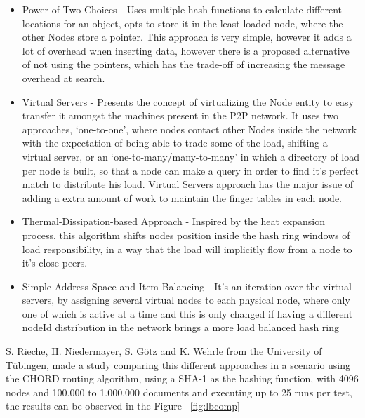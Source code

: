 \begin{itemize}
   \item Power of Two Choices\cite{Byers} - Uses multiple hash functions to calculate different locations for an object, opts to store it in the least loaded node, where the other Nodes store a pointer. This approach is very simple, however it adds a lot of overhead when inserting data, however there is a proposed alternative of not using the pointers, which has the trade-off of increasing the message overhead at search.
   \item Virtual Servers\cite{Rao2003} - Presents the concept of virtualizing the Node entity to easy transfer it amongst the machines present in the P2P network. It uses two approaches, `one-to-one', where nodes contact other Nodes inside the network with the expectation of being able to trade some of the load, shifting a virtual server, or an `one-to-many/many-to-many' in which a directory of load per node is built, so that a node can make a query in order to find it's perfect match to distribute his load. Virtual Servers approach has the major issue of adding a extra amount of work to maintain the finger tables in each node.
   \item Thermal-Dissipation-based Approach\cite{Rieche} - Inspired by the heat expansion process, this algorithm shifts nodes position inside the hash ring windows of load responsibility, in a way that the load will implicitly flow from a node to it's close peers.
   \item Simple Address-Space and Item Balancing\cite{Karger2004} - It's an iteration over the virtual servers, by assigning several virtual nodes to each physical node, where only one of which is active at a time and this is only changed if having a different nodeId distribution in the network brings a more load balanced hash ring
 \end{itemize} 

S. Rieche, H. Niedermayer, S. Götz and  K. Wehrle from the University of Tübingen, made a study comparing this different approaches in a scenario using the CHORD routing algorithm, using a SHA-1 as the hashing function, with 4096 nodes and 100.000 to 1.000.000 documents and executing up to 25 runs per test, the results can be observed in the Figure ~\ref{fig:lbcomp}


